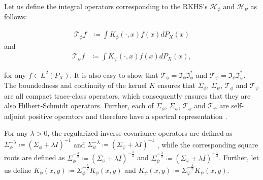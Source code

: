 \documentclass[11pt]{article}
\newcommand{\repone}{\phi}
\newcommand{\reptwo}{\psi}
\newcommand{\Hone}{\mathcal{H}_{\phi}}
\newcommand{\Htwo}{\mathcal{H}_{\psi}}
\newcommand{\LPtwo}{L^{2}(P_{X})}
\theoremstyle{plain}
\begin{document}
Let us define the integral operators corresponding to the RKHS's $\Hone$ and $\Htwo$ as follows:


\[
\begin{aligned}
    \mathcal{T}_{\repone} f &\coloneq \int K_{\repone}(\cdot,x) f(x) dP_{X}(x)
\end{aligned}
\]
and 
\[
\begin{aligned}
    \mathcal{T}_{\reptwo} f &\coloneq \int K_{\reptwo}(\cdot,x) f(x) dP_{X}(x),
\end{aligned}
\]

for any $f \in \LPtwo$.
It is also easy to show that $\mathcal{T}_{\repone} = \mathfrak{I}_{\repone}\mathfrak{I}_{\repone}^{*}$ and $\mathcal{T}_{\reptwo} = \mathfrak{I}_{\reptwo}\mathfrak{I}_{\reptwo} ^{*}$. The boundedness and continuity of the kernel $K$ ensures that $\Sigma_{\repone}$, $\Sigma_{\reptwo}$, $\mathcal{T}_{\repone}$ and $\mathcal{T}_{\reptwo}$ are all compact trace-class operators, which consequently ensures that they are also Hilbert-Schmidt operators. Further, each of $\Sigma_{\repone}$, $\Sigma_{\reptwo}$, $\mathcal{T}_{\repone}$ and $\mathcal{T}_{\reptwo}$ are self-adjoint positive operators and therefore have a spectral representation \citep[Theorems~VI.16,VI.17]{reed1980methods}.

For any $\lambda>0$, the regularized inverse covariance operators are defined as $\Sigma_{\repone}^{-\lambda} \coloneq \left(\Sigma_{\repone} + \lambda I\right)^{-1}$ and $\Sigma_{\reptwo}^{-\lambda} \coloneq \left(\Sigma_{\reptwo} + \lambda I\right)^{-1}$ , while the corresponding square roots are defined as  $\Sigma_{\repone}^{-\frac{\lambda}{2}} \coloneq \left(\Sigma_{\repone} + \lambda I\right)^{-\frac{1}{2}}$ and $\Sigma_{\reptwo}^{-\frac{\lambda}{2}} \coloneq \left(\Sigma_{\reptwo} + \lambda I\right)^{-\frac{1}{2}}$. Further, let us  define $\widetilde{K}_{\repone}(x,y) \coloneq \Sigma_{\repone}^{-\frac{\lambda}{2}}K_{\repone}(x,y)$ and $\widetilde{K}_{\reptwo}(x,y)\coloneq \Sigma_{\reptwo}^{-\frac{\lambda}{2}}K_{\reptwo}(x,y)$.
\end{document}
